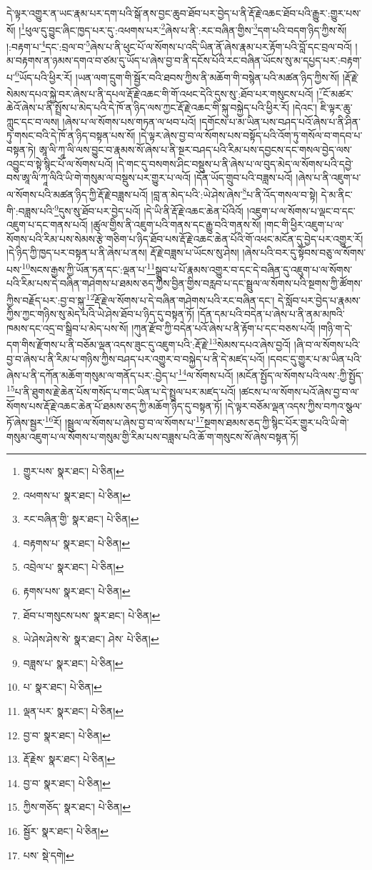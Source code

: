དེ་ལྟར་འགྱུར་ན་ཡང་རྣམ་པར་དག་པའི་སྒོ་ནས་བྱང་ཆུབ་ཐོབ་པར་བྱེད་པ་ནི་རྡོ་རྗེ་འཆང་ཐོབ་པའི་རྒྱུར་:གྱུར་པས་སོ། །\footnote{གྱུར་པས་  སྣར་ཐང་།  པེ་ཅིན། }ཕུལ་དུ་བྱུང་ཞིང་ཁྱད་པར་དུ་:འཕགས་པར་\footnote{འཕགས་པ་  སྣར་ཐང་།  པེ་ཅིན། }ཞེས་པ་ནི་:རང་བཞིན་གྱིས་\footnote{རང་བཞིན་གྱི་  སྣར་ཐང་།  པེ་ཅིན། }དག་པའི་བདག་ཉིད་ཀྱིས་སོ། །:བརྟག་པ་\footnote{བརྟགས་པ་  སྣར་ཐང་།  པེ་ཅིན། }དང་:བྲལ་བ་\footnote{འབྲེལ་པ་  སྣར་ཐང་།  པེ་ཅིན། }ཞེས་པ་ནི་ཕུང་པོ་ལ་སོགས་པ་འདི་ཡིན་ནོ་ཞེས་རྣམ་པར་རྟོག་པའི་བློ་དང་བྲལ་བའོ། །མ་བརྟགས་ན་ཉམས་དགའ་བ་ཙམ་དུ་ཡོད་པ་ཞེས་བྱ་བ་ནི་དངོས་པོའི་རང་བཞིན་ཡོངས་སུ་མ་དཔྱད་པར་:བརྟག་པ་\footnote{རྟགས་པས་  སྣར་ཐང་།  པེ་ཅིན། }ཡོད་པའི་ཕྱིར་རོ། །ཡན་ལག་དྲུག་གི་སྦྱོར་བའི་ཐབས་ཀྱིས་ནི་མཆོག་གི་བསྙེན་པའི་མཚན་ཉིད་ཀྱིས་སོ། །རྡོ་རྗེ་སེམས་དཔའ་སྐྱེ་བར་ཞེས་པ་ནི་དཔལ་རྡོ་རྗེ་འཆང་གི་གོ་འཕང་དེའི་དུས་སུ་:ཐོབ་པར་གསུངས་པའོ། །\footnote{ཐོབ་པ་གསུངས་པས་  སྣར་ཐང་།  པེ་ཅིན། }ངོ་མཚར་ཆེའོ་ཞེས་པ་ནི་སྤྲོས་པ་མེད་པའི་དེ་ཁོ་ན་ཉིད་ལས་ཀྱང་རྡོ་རྗེ་འཆང་གི་སྐུ་བསྐྱེད་པའི་ཕྱིར་རོ། །དེའང་། ཇི་ལྟར་ཆུ་ཀླུང་དང་བ་ལས། །ཞེས་པ་ལ་སོགས་པས་གཏན་ལ་ཕབ་པའོ། །དགོངས་པ་མ་ཡིན་པས་བཤད་པའོ་ཞེས་པ་ནི་ཤིན་ཏུ་གསང་བའི་དེ་ཁོ་ན་ཉིད་བསྟན་པས་སོ། །དེ་ལྟར་ཞེས་བྱ་བ་ལ་སོགས་པས་བསྟོད་པའི་འོག་ཏུ་གསོལ་བ་གདབ་པ་བསྟན་ཏེ། ཨཱ་ལི་ཀཱ་ལི་ལས་བྱུང་བ་རྣམས་སོ་ཞེས་པ་ནི་སྔར་བཤད་པའི་རིམ་པས་དབྱངས་དང་གསལ་བྱེད་ལས་འབྱུང་བ་སྟེ་སྙིང་པོ་ལ་སོགས་པའོ། །དེ་གང་དུ་བསགས་ཤིང་བསྡུས་པ་ནི་ཞེས་པ་ལ་བུད་མེད་ལ་སོགས་པའི་དབྱེ་བས་ཨཱ་ལི་ཀཱ་ལིའི་ཡི་གེ་གསུམ་ལ་བསྡུས་པར་གྱུར་པ་ལའོ། །དོན་ཡོད་གྲུབ་པའི་བཟླས་པའོ། །ཞེས་པ་ནི་འཇུག་པ་ལ་སོགས་པའི་མཚན་ཉིད་ཀྱི་རྡོ་རྗེ་བཟླས་པའོ། །བླ་ན་མེད་པའི་:ཡེ་ཤེས་ཞེས་\footnote{ཡེ་ཤེས་ཤེས་ེས་  སྣར་ཐང་། ཤེས་  པེ་ཅིན། }པ་ནི་འོད་གསལ་བ་སྟེ། དེ་མ་ནིང་གི་:བཟླས་པའི་\footnote{བཟླས་པ་  སྣར་ཐང་།  པེ་ཅིན། }དུས་སུ་ཐོབ་པར་བྱེད་པའོ། །དེ་ཡི་ནི་རྡོ་རྗེ་འཆང་ཆེན་པོའིའོ། །འཇུག་པ་ལ་སོགས་པ་ལྡང་བ་དང་འཇུག་པ་དང་གནས་པའོ། །ཚུལ་གྱིས་ནི་འཇུག་པའི་གནས་དང་རྒྱུ་བའི་གནས་སོ། །གང་གི་ཕྱིར་འཇུག་པ་ལ་སོགས་པའི་རིམ་པས་སེམས་རྩེ་གཅིག་པ་ཉིད་ཐོབ་པས་རྡོ་རྗེ་འཆང་ཆེན་པོའི་གོ་འཕང་མངོན་དུ་བྱེད་པར་འགྱུར་རོ། །དེ་ཉིད་ཀྱི་ཁྱད་པར་བསྟན་པ་ནི་ཞེས་པ་ནས། རྡོ་རྗེ་བཟླས་པ་ཡོངས་སུ་ཤེས། །ཞེས་པའི་བར་དུ་སྟོབས་བཅུ་ལ་སོགས་པས་\footnote{པ་  སྣར་ཐང་།  པེ་ཅིན། }སངས་རྒྱས་ཀྱི་ཡོན་ཏན་དང་:ལྡན་པ་\footnote{ལྡན་པར་  སྣར་ཐང་།  པེ་ཅིན། }སྒྲུབ་པ་པོ་རྣམས་འགྱུར་བ་དང་དེ་བཞིན་དུ་འཇུག་པ་ལ་སོགས་པའི་རིམ་པས་དེ་བཞིན་གཤེགས་པ་ཐམས་ཅད་ཀྱིས་བྱིན་གྱིས་བརླབ་པ་དང་སྦྲུལ་ལ་སོགས་པའི་སྔགས་ཀྱི་ཚོགས་ཀྱིས་བརྗོད་པར་:བྱ་བ་སྐུ་\footnote{བྱ་བ་  སྣར་ཐང་།  པེ་ཅིན། }རྡོ་རྗེ་ལ་སོགས་པ་དེ་བཞིན་གཤེགས་པའི་རང་བཞིན་དང་། དེ་སློབ་པར་བྱེད་པ་རྣམས་ཀྱིས་ཀྱང་གཉིས་སུ་མེད་པའི་ཡེ་ཤེས་ཐོབ་པ་ཉིད་དུ་བསྟན་ཏོ། །དོན་དམ་པའི་བདེན་པ་ཞེས་པ་ནི་ནམ་མཁའི་ཁམས་དང་འདྲ་བ་སྒྲིབ་པ་མེད་པས་སོ། །ཀུན་རྫོབ་ཀྱི་བདེན་པའོ་ཞེས་པ་ནི་རྟོག་པ་དང་བཅས་པའོ། །གཉི་ག་དེ་དག་གིས་རྫོགས་པ་ནི་བཅོམ་ལྡན་འདས་ཟུང་དུ་འཇུག་པའི་:རྡོ་རྗེ་\footnote{རྡོ་རྗེས་  སྣར་ཐང་།  པེ་ཅིན། }སེམས་དཔའ་ཞེས་བྱའོ། །ཞི་བ་ལ་སོགས་པའི་བྱ་བ་ཞེས་པ་ནི་རིམ་པ་གཉིས་ཀྱིས་བཤད་པར་འགྱུར་བ་བསྐྱེད་པ་ནི་དེ་མཛད་པའོ། །དབང་དུ་གྱུར་པ་མ་ཡིན་པའི་ཞེས་པ་ནི་དཀོན་མཆོག་གསུམ་ལ་གནོད་པར་:བྱེད་པ་\footnote{བྱ་བ་  སྣར་ཐང་།  པེ་ཅིན། }ལ་སོགས་པའོ། །མངོན་སྤྱོད་ལ་སོགས་པའི་ལས་:ཀྱི་སྤྱོད་\footnote{ཀྱིས་གཅོད་  སྣར་ཐང་།  པེ་ཅིན། }པ་ནི་ཐུགས་རྗེ་ཆེན་པོས་གསོད་པ་གང་ཡིན་པ་དེ་སྤྲུལ་པར་མཛད་པའོ། །ཚངས་པ་ལ་སོགས་པའོ་ཞེས་བྱ་བ་ལ་སོགས་པས་རྡོ་རྗེ་འཆང་ཆེན་པོ་ཐམས་ཅད་ཀྱི་མཆོག་ཉིད་དུ་བསྟན་ཏོ། །དེ་ལྟར་བཅོམ་ལྡན་འདས་ཀྱིས་བཀའ་སྩལ་ཏོ་ཞེས་སྦྱར་\footnote{སྦྱོར་  སྣར་ཐང་།  པེ་ཅིན། }རོ། །སྦྲུལ་ལ་སོགས་པ་ཞེས་བྱ་བ་ལ་སོགས་པ་\footnote{པས་  སྡེ་དགེ། }སྔགས་ཐམས་ཅད་ཀྱི་སྙིང་པོར་གྱུར་པའི་ཡི་གེ་གསུམ་འཇུག་པ་ལ་སོགས་པ་གསུམ་གྱི་རིམ་པས་བཟླས་པའི་ཆོ་ག་གསུངས་སོ་ཞེས་བསྟན་ཏོ། 